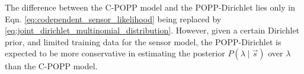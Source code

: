 The difference between the C-POPP model and the POPP-Dirichlet lies only in Eqn. \ref{eq:codependent_sensor_likelihood} being replaced by \ref{eq:joint_dirichlet_multinomial_distribution}. However, given a certain Dirichlet prior, and limited training data for the sensor model, the POPP-Dirichlet is expected to be more conservative in estimating the posterior $P(\lambda \mid \vec{s})$ over $\lambda$ than the C-POPP model.

